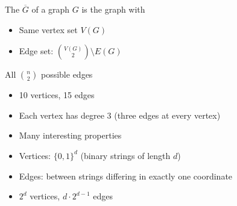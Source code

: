 \documentclass[8pt,a4paper,landscape]{extarticle}
\begin{document}
\begin{cscolumns}
\begin{definition}[Complement]
The  $\overline{G}$ of a graph $G$ is the graph with
\begin{itemize}
\item Same vertex set $V(G)$
\item Edge set: $\binom{V(G)}{2}\setminus E(G)$
\end{itemize}
\end{definition}

\begin{definition}
All $\binom{n}{2}$ possible edges
\end{definition}

\begin{minipage}[c]{0.58\linewidth}
\begin{itemize}
\item 10 vertices, 15 edges
\item Each vertex has degree 3 (three edges at every vertex)
\item Many interesting properties
\end{itemize}
\end{minipage}\hfill
\begin{minipage}[c]{0.38\linewidth}\centering
{}
\end{minipage}

\begin{definition}
\begin{itemize}
\item Vertices: $\{0,1\}^d$ (binary strings of length $d$)
\item Edges: between strings differing in exactly one coordinate
\item $2^d$ vertices, $d\cdot 2^{d-1}$ edges
\end{itemize}
\end{definition}


\end{cscolumns}
\end{document}

